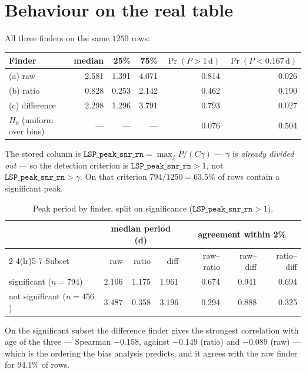 \documentclass[11pt]{article}
\newcommand{\Srn}{\texttt{LSP\_peak\_snr\_rn}}
\begin{document}
\section{Behaviour on the real table}

All three finders on the same $1250$ rows:

\begin{table}[htbp]
\centering
\begin{tabular}{lrrrrr}
\toprule
Finder & median & 25\% & 75\% & $\Pr(P>1\,\mathrm{d})$ & $\Pr(P<0.167\,\mathrm{d})$ \\
\midrule
(a) raw        & 2.581 & 1.391 & 4.071 & 0.814 & 0.026 \\
(b) ratio      & 0.828 & 0.253 & 2.142 & 0.462 & 0.190 \\
(c) difference & 2.298 & 1.296 & 3.791 & 0.793 & 0.027 \\
\midrule
$H_0$ (uniform over bins) & --- & --- & --- & 0.076 & 0.504 \\
\bottomrule
\end{tabular}
\end{table}

The stored column is $\Srn = \max_f P/(C\gamma)$ --- $\gamma$ is \emph{already divided
out} --- so the detection criterion is $\Srn > 1$, not $\Srn > \gamma$. On that criterion
$794/1250 = 63.5\%$ of rows contain a significant peak.

\begin{table}[htbp]
\centering
\caption{Peak period by finder, split on significance ($\Srn > 1$).}
\begin{tabular}{lrrrrrr}
\toprule
 & \multicolumn{3}{c}{median period (d)} & \multicolumn{3}{c}{agreement within 2\%} \\
\cmidrule(lr){2-4}\cmidrule(lr){5-7}
Subset & raw & ratio & diff & raw--ratio & raw--diff & ratio--diff \\
\midrule
significant \;($n=794$)     & 2.106 & 1.175 & 1.961 & 0.674 & 0.941 & 0.694 \\
not significant \;($n=456$) & 3.487 & 0.358 & 3.196 & 0.294 & 0.888 & 0.325 \\
\bottomrule
\end{tabular}
\end{table}

On the significant subset the difference finder gives the strongest correlation with age
of the three --- Spearman $-0.158$, against $-0.149$ (ratio) and $-0.089$ (raw) --- which
is the ordering the bias analysis predicts, and it agrees with the raw finder for
$94.1\%$ of rows.
\end{document}
